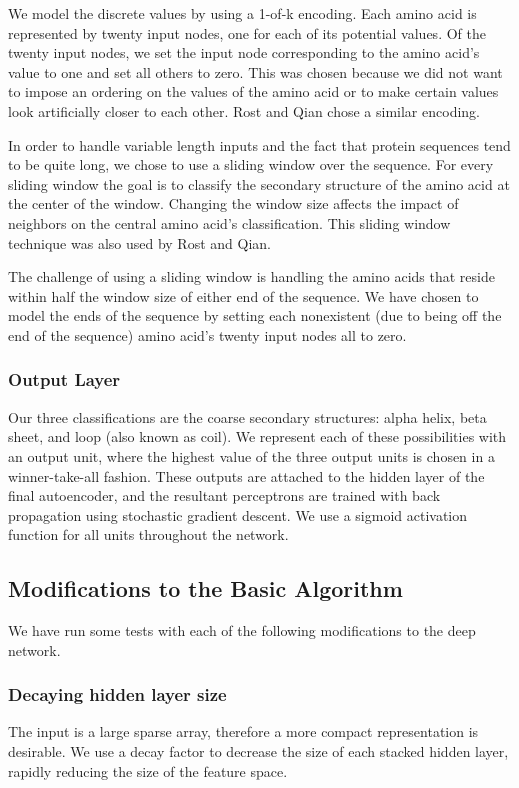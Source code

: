 \documentclass[letterpaper,twocolumn,12pt]{article}
\begin{document}
We model the discrete values by using a 1-of-k encoding.
Each amino acid is represented by twenty input nodes, one for each of its potential values.
Of the twenty input nodes, we set the input node corresponding to the amino acid's value to one and set all others to zero.
This was chosen because we did not want to impose an ordering on the values of the amino acid or to make certain values look artificially closer to each other.
Rost and Qian chose a similar encoding.

In order to handle variable length inputs and the fact that protein sequences tend to be quite long, we chose to use a sliding window over the sequence.
For every sliding window the goal is to classify the secondary structure of the amino acid at the center of the window.
Changing the window size affects the impact of neighbors on the central amino acid's classification.
This sliding window technique was also used by Rost and Qian.

The challenge of using a sliding window is handling the amino acids that reside within half the window size of either end of the sequence.
We have chosen to model the ends of the sequence by setting each nonexistent (due to being off the end of the sequence) amino acid's twenty input nodes all to zero.

\subsubsection{Output Layer}
Our three classifications are the coarse secondary structures: alpha helix, beta sheet, and loop (also known as coil).
We represent each of these possibilities with an output unit, where the highest value of the three output units is chosen in a winner-take-all fashion.
These outputs are attached to the hidden layer of the final autoencoder, and the resultant perceptrons are trained with back propagation using stochastic gradient descent.
We use a sigmoid activation function for all units throughout the network.

\subsection{Modifications to the Basic Algorithm}
\label{subsec:mods}
We have run some tests with each of the following modifications to the deep network.

\subsubsection{Decaying hidden layer size}
The input is a large sparse array, therefore a more compact representation is desirable.
We use a decay factor to decrease the size of each stacked hidden layer, rapidly reducing the size of the feature space.
\end{document}
